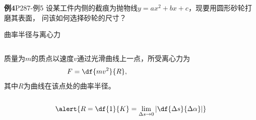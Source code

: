 \begin{frame}
	\linespread{1.5} 
	\begin{exampleblock}{{\bf 例4}\hfill P287-例5}
		设某工件内侧的截痕为抛物线$y=ax^2+bx+c$，现要用圆形砂轮打磨其表面，
		问该如何选择砂轮的尺寸？
	\end{exampleblock}
	\pause 
	\begin{center}
	\end{center}
\end{frame}

\begin{frame}{曲率半径与离心力}
	\linespread{1.2}
	\begin{columns}
			质量为$m$的质点以速度$v$通过光滑曲线上一点，所受离心力为
			$$F=\df{mv^2}{R},$$
			其中$R$为曲线在该点处的曲率半径。
			\begin{center}
			\end{center}
	\end{columns}
	\pause
	$$\alert{R=\df{1}{K}=\lim\limits_{\Delta s\to 0}\left|\df{\Delta
	s}{\Delta\alpha}\right|}$$
\end{frame}

